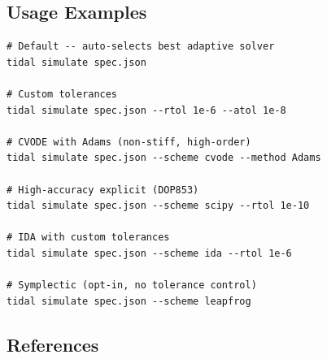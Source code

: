 \subsection{Usage Examples}
\label{sec:usage-examples}

\begin{lstlisting}[style=bash]
# Default -- auto-selects best adaptive solver
tidal simulate spec.json

# Custom tolerances
tidal simulate spec.json --rtol 1e-6 --atol 1e-8

# CVODE with Adams (non-stiff, high-order)
tidal simulate spec.json --scheme cvode --method Adams

# High-accuracy explicit (DOP853)
tidal simulate spec.json --scheme scipy --rtol 1e-10

# IDA with custom tolerances
tidal simulate spec.json --scheme ida --rtol 1e-6

# Symplectic (opt-in, no tolerance control)
tidal simulate spec.json --scheme leapfrog
\end{lstlisting}

\subsection{References}
\label{sec:at-references}

